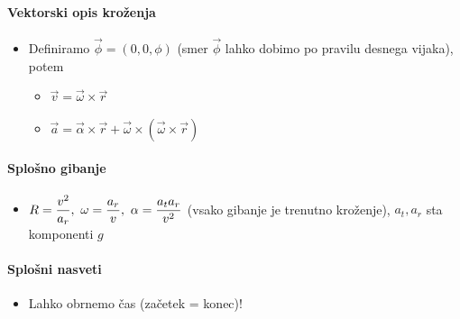 \paragraph{Vektorski opis kroženja}
\begin{itemize}
    \item Definiramo \(\vec{\phi} = (0, 0, \phi)\) (smer \(\vec{\phi}\) lahko dobimo po pravilu desnega vijaka), potem
    \begin{itemize}
        \item \(\vec{v} = \vec{\omega} \times \vec{r}\)
        \item \(\vec{a} = \vec{\alpha} \times \vec{r} + \vec{\omega} \times (\vec{\omega} \times \vec{r})\)
    \end{itemize}
\end{itemize}

\paragraph{Splošno gibanje}
\begin{itemize}
    \item \(\displaystyle R = \frac{v^2}{a_r}, \ \omega = \frac{a_r}{v}, \ \alpha = \frac{a_t a_r}{v^2}\) (vsako gibanje je trenutno kroženje), \(a_t, a_r\) sta komponenti \(g\)
\end{itemize}

\paragraph{Splošni nasveti}
\begin{itemize}
    \item Lahko obrnemo čas (začetek = konec)!
\end{itemize}